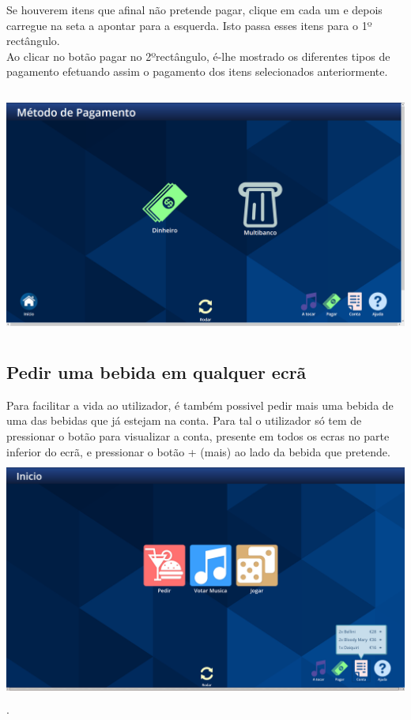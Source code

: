 \documentclass{article}
\begin{document}
Se houverem itens que afinal não pretende pagar, clique em cada um e depois carregue na seta a apontar para a esquerda. Isto passa esses itens para o 1º rectângulo.\\
Ao clicar no botão pagar no 2ºrectângulo, é-lhe mostrado os diferentes tipos de pagamento efetuando assim o pagamento dos itens selecionados anteriormente.\\\\
\includegraphics[width=15cm, height=8cm]{user_manual_images/payment_methods.png}
\subsection{Pedir uma bebida em qualquer ecrã}
Para facilitar a vida ao utilizador, é também possivel pedir mais uma bebida de uma das bebidas que já estejam na conta. Para tal o utilizador só tem de pressionar o botão para visualizar a conta, presente em todos os ecras no parte inferior do ecrã, e pressionar o botão + (mais) ao lado da bebida que pretende.\\
\includegraphics[width=15cm, height=8cm]{user_manual_images/order_ballon.png}.
\end{document}
